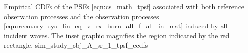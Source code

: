 %
{%
 Empirical \acfp{CDF} of
 the \aclp{PSF}
 \eqref{eqn:cs_math_tpsf} associated with
 both reference observation processes and
 the observation processes
 \eqref{eqn:recovery_sys_lin_eq_v_rx_born_all_f_all_in_mat} induced by
 all incident waves.
 The inset graphic magnifies
 the region indicated by
 the red rectangle.
}%
{sim_study_obj_A_sr_1_tpsf_ecdfs}

